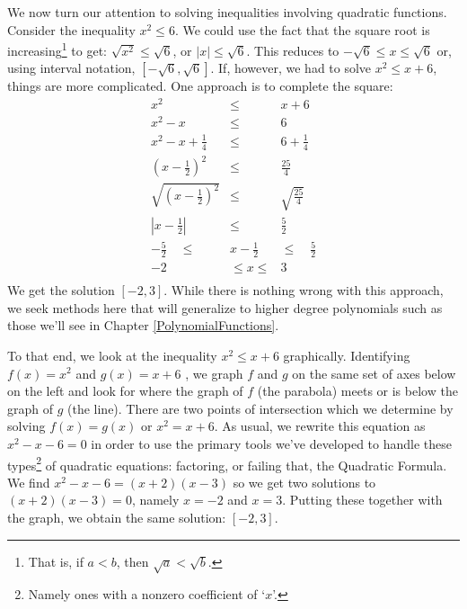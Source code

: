 \documentclass{ximera}
\begin{document}
We now turn our attention to solving inequalities involving quadratic functions.   Consider the inequality $x^2 \leq 6$.  We could use the fact that the square root is increasing\footnote{That is, if $a < b$, then $\sqrt{a} < \sqrt{b}$.} to get: $\sqrt{x^2} \leq \sqrt{6}$, or $|x| \leq \sqrt{6}$.  This reduces to $-\sqrt{6} \leq x \leq \sqrt{6}$ or, using interval notation, $[-\sqrt{6}, \sqrt{6}]$. If, however, we had to solve $x^2 \leq x+6$, things are more complicated.  One approach is to complete the square: \[ \begin{array}{rcl}

x^2 & \leq & x+6 \\
x^2 - x & \leq & 6 \\
x^2 - x + \frac{1}{4} & \leq &  6 + \frac{1}{4} \\ [3pt]

\left(x - \frac{1}{2} \right)^2 & \leq & \frac{25}{4} \\ [3pt]

\sqrt{\left(x - \frac{1}{2} \right)^2} & \leq & \sqrt{\frac{25}{4}} \\ [3pt]

\left| x - \frac{1}{2} \right| & \leq & \frac{5}{2} \\ 

-\frac{5}{2} \quad \leq & x - \frac{1}{2} & \leq \quad \frac{5}{2} \\ 

-2 \quad &  \leq  x  \leq & 3 \\  \end{array} \] We get the solution $[-2,3]$.  While there is nothing wrong with this approach, we seek methods here that will generalize to higher degree polynomials such as those we'll see in Chapter \ref{PolynomialFunctions}.  

\medskip

To that end, we look at the inequality $x^2 \leq x+6$ graphically.  Identifying $f(x) = x^2$ and $g(x) = x+6$ , we graph $f$ and $g$ on the same set of axes below on the left and look for where the graph of $f$ (the parabola) meets or is below the graph of $g$ (the line).  There are two points of intersection which we determine by solving  $f(x) = g(x)$ or $x^2=x+6$.  As usual, we rewrite this equation as $x^2-x-6 = 0$ in order to use the primary tools we've developed to handle these types\footnote{Namely ones with a nonzero coefficient of `$x$'.} of quadratic equations: factoring, or failing that, the Quadratic Formula.  We find $x^2-x-6 = (x+2)(x-3)$ so we get two solutions to $(x+2)(x-3) = 0$, namely $x = -2$ and $x = 3$.  Putting these together with the graph, we obtain the same solution:  $[-2,3]$.  
\end{document}
